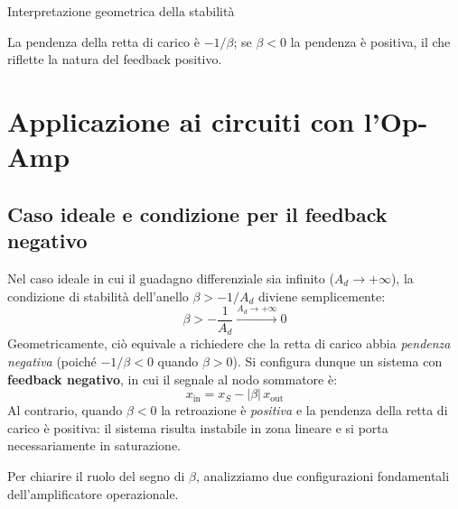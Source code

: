 \begin{osservazione}{Interpretazione geometrica della stabilità}
\smallskip
\begin{note}La pendenza della retta di carico è $-1/\beta$; se $\beta < 0$ la pendenza è positiva, il che riflette la natura del feedback positivo.\end{note}
\end{osservazione}

\section{Applicazione ai circuiti con l'Op-Amp}

\subsection*{Caso ideale e condizione per il feedback negativo}

Nel caso ideale in cui il guadagno differenziale sia infinito ($A_d \to +\infty$), la condizione di stabilità dell'anello $\beta > -1/A_d$ diviene semplicemente:
\[
    \beta > -\frac{1}{A_d} \xrightarrow{A_d \to +\infty} 0
\]
Geometricamente, ciò equivale a richiedere che la retta di carico abbia \textit{pendenza negativa} (poiché $-1/\beta < 0$ quando $\beta > 0$). Si configura dunque un sistema con \textbf{feedback negativo}, in cui il segnale al nodo sommatore è:
\[
    x_{\mathrm{in}} = x_S - |\beta|\, x_{\mathrm{out}}
\]
Al contrario, quando $\beta < 0$ la retroazione è \textit{positiva} e la pendenza della retta di carico è positiva: il sistema risulta instabile in zona lineare e si porta necessariamente in saturazione.

\medskip
\noindent
Per chiarire il ruolo del segno di $\beta$, analizziamo due configurazioni fondamentali dell'amplificatore operazionale.


